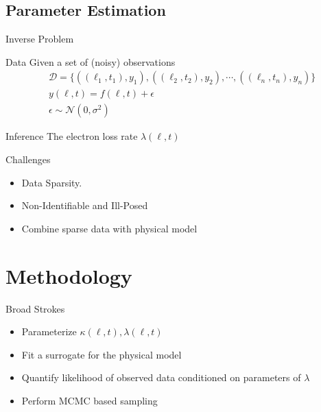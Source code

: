 \documentclass{beamer}
\begin{document}
\subsection{Parameter Estimation}

\begin{frame}{Inverse Problem}
  \begin{block}{Data}
    Given a set of (noisy) observations
    \begin{align*}
      & \mathcal{D} = \{ ((\ell_1, t_1), y_1), ((\ell_2, t_2), y_2),
                    \cdots, ((\ell_n, t_n), y_n) \} \\
      & y(\ell, t) = f(\ell, t) + \epsilon \\
      & \epsilon \sim \mathcal{N}(0, \sigma^2)
    \end{align*}
  \end{block}
  
  \begin{block}{Inference}
    The electron loss rate $\lambda(\ell, t)$
  \end{block}
\end{frame}

\begin{frame}{Challenges}
  \begin{itemize}
  \item<1->{
      Data Sparsity.
    }
  \item<2->{Non-Identifiable and Ill-Posed}
  \item<3->{Combine sparse data with physical model}
  \end{itemize}
\end{frame}


\section{Methodology}

\begin{frame}{Broad Strokes}
  \begin{itemize}
  \item<1->{
      Parameterize $\kappa(\ell, t), \lambda(\ell, t)$
    }
  \item<2->{Fit a surrogate for the physical model}
  \item<3->{Quantify likelihood of observed data conditioned on
      parameters of $\lambda$}
  \item<4->{Perform MCMC based sampling}
  \end{itemize}
\end{frame}
\end{document}
